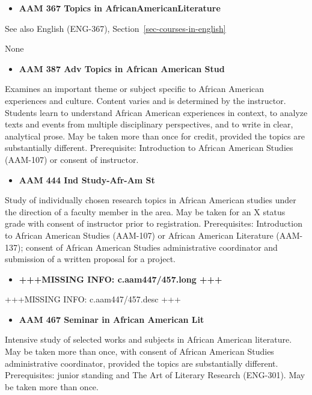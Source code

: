 \documentclass[
  letterpaper,
]{scrbook}
\providecommand{\tightlist}{%
  \setlength{\itemsep}{0pt}\setlength{\parskip}{0pt}}
\begin{document}
\begin{itemize}
\tightlist
\item
  \textbf{AAM 367 Topics in AfricanAmericanLiterature}
\end{itemize}

See also English (ENG-367), Section~\ref{sec-courses-in-english}

None

\begin{itemize}
\tightlist
\item
  \textbf{AAM 387 Adv Topics in African American Stud}
\end{itemize}

Examines an important theme or subject specific to African American
experiences and culture. Content varies and is determined by the
instructor. Students learn to understand African American experiences in
context, to analyze texts and events from multiple disciplinary
perspectives, and to write in clear, analytical prose. May be taken more
than once for credit, provided the topics are substantially different.
Prerequisite: Introduction to African American Studies (AAM-107) or
consent of instructor.

\begin{itemize}
\tightlist
\item
  \textbf{AAM 444 Ind Study-Afr-Am St}
\end{itemize}

Study of individually chosen research topics in African American studies
under the direction of a faculty member in the area. May be taken for an
X status grade with consent of instructor prior to registration.
Prerequisites: Introduction to African American Studies (AAM-107) or
African American Literature (AAM-137); consent of African American
Studies administrative coordinator and submission of a written proposal
for a project.

\begin{itemize}
\tightlist
\item
  \textbf{+++MISSING INFO: c.aam447/457.long +++}
\end{itemize}

+++MISSING INFO: c.aam447/457.desc +++

\begin{itemize}
\tightlist
\item
  \textbf{AAM 467 Seminar in African American Lit}
\end{itemize}

Intensive study of selected works and subjects in African American
literature. May be taken more than once, with consent of African
American Studies administrative coordinator, provided the topics are
substantially different. Prerequisites: junior standing and The Art of
Literary Research (ENG-301). May be taken more than once.
\end{document}

